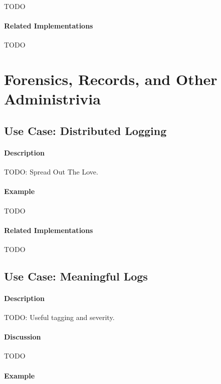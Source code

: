{\Large TODO}

\paragraph{Related Implementations}

{\Large TODO}

\section{Forensics, Records, and Other Administrivia}

\subsection{Use Case: Distributed Logging}

\paragraph{Description}

{\Large TODO:} Spread Out The Love.

\paragraph{Example}

{\Large TODO}

\paragraph{Related Implementations}

{\Large TODO}

\subsection{Use Case: Meaningful Logs}

\paragraph{Description}

{\Large TODO:} Useful tagging and severity.

\paragraph{Discussion}

{\Large TODO}

\paragraph{Example}

